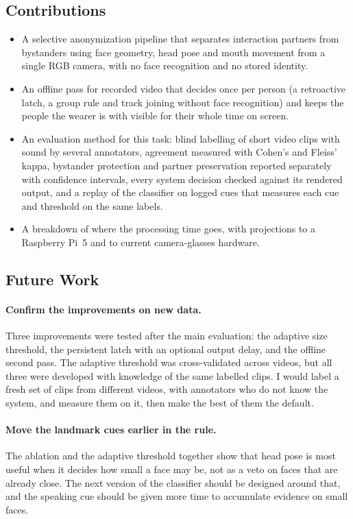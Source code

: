\subsection{Contributions}

\begin{itemize}
  \item A selective anonymization pipeline that separates interaction partners from
        bystanders using face geometry, head pose and mouth movement from a single RGB
        camera, with no face recognition and no stored identity.
    \item An offline pass for recorded video that decides once per person (a retroactive
        latch, a group rule and track joining without face recognition) and keeps the people
        the wearer is with visible for their whole time on screen.
  \item An evaluation method for this task: blind labelling of short video clips with
        sound by several annotators, agreement measured with Cohen's and Fleiss' kappa,
        bystander protection and partner preservation reported separately with confidence
        intervals, every system decision checked against its rendered output, and a replay
        of the classifier on logged cues that measures each cue and threshold on the same
        labels.
  \item A breakdown of where the processing time goes, with projections to a
        Raspberry Pi~5 and to current camera-glasses hardware.
\end{itemize}

\subsection{Future Work}

\paragraph{Confirm the improvements on new data.}
Three improvements were tested after the main evaluation: the adaptive size threshold,
the persistent latch with an optional output delay, and the offline second pass. The
adaptive threshold was cross-validated across videos, but all three were developed with
knowledge of the same labelled clips. I would label a fresh set of clips from different
videos, with annotators who do not know the system, and measure them on it, then make the
best of them the default.

\paragraph{Move the landmark cues earlier in the rule.}
The ablation and the adaptive threshold together show that head pose is most useful when it
decides how small a face may be, not as a veto on faces that are already close. The next
version of the classifier should be designed around that, and the speaking cue should be
given more time to accumulate evidence on small faces.

